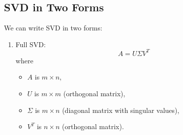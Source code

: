 \subsection{SVD in Two Forms}
\begin{definition}
    We can write SVD in two forms:
    \begin{enumerate}
        \item Full SVD:
        \[
        A = U \Sigma V^T
        \]
        where
        \begin{itemize}
            \item \( A \) is \( m \times n \),
            \item \( U \) is \( m \times m \) (orthogonal matrix),
            \item \( \Sigma \) is \( m \times n \) (diagonal matrix with singular values),
            \item \( V^T \) is \( n \times n \) (orthogonal matrix).
        \end{itemize}
        \vspace{1em}
    

\end{enumerate}
\end{definition}
